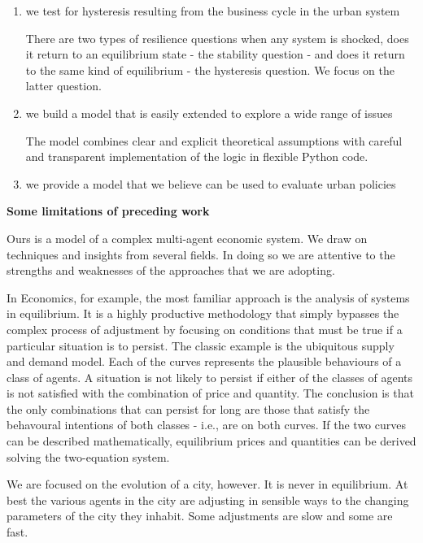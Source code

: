 \begin{enumerate}
    \item we test for hysteresis resulting from the business cycle   in the urban system 

There are two types of resilience questions when any system is shocked, does it return to an equilibrium state - the stability question - and does it return to the same kind of equilibrium - the hysteresis question. We focus on the latter question.  


    \item we build a model that is easily extended to explore a wide range of issues

The model combines clear and explicit theoretical assumptions with careful and transparent implementation of the logic in flexible Python code.

    \item we provide a model that we believe can be used  to evaluate urban policies
\end{enumerate}




\textbf{Some limitations of preceding work}%

Ours is a  model of a complex multi-agent economic system. We draw on techniques and insights from several fields. In doing so we are attentive to the strengths and weaknesses of  the  approaches that we are adopting. 

In Economics, for example, the most familiar approach is the  analysis of systems in equilibrium. It is a highly productive methodology that simply bypasses the complex process of adjustment by focusing on conditions that must be true if a particular situation is to persist. The classic example is the ubiquitous supply and demand model. Each of the curves represents the plausible behaviours of a class of agents. A  situation is not likely to persist if either of the classes of agents is not satisfied with the combination of price and quantity. The conclusion   is that the only combinations that can persist for long are  those that satisfy the behavoural intentions of both classes - i.e., are on both curves. If the two curves can be described mathematically, equilibrium prices and quantities  can be derived solving the two-equation system.

We are focused on the evolution of a city, however. It is never in equilibrium. At best the various agents in the city are adjusting in sensible ways to the changing parameters of the city they inhabit. Some adjustments are slow and some are fast. 


